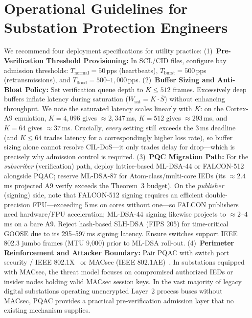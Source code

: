 \documentclass[journal]{IEEEtran}
\begin{document}
\section{Operational Guidelines for Substation Protection Engineers}
\label{sec:guidelines}
We recommend four deployment specifications for utility practice:
(1)~\textbf{Pre-Verification Threshold Provisioning:} In SCL/CID files, configure bay admission thresholds: $T_{\text{normal}} = 50$\,pps (heartbeats), $T_{\text{burst}} = 500$\,pps (retransmissions), and $T_{\text{flood}} = 500\text{--}1{,}000$\,pps.
(2)~\textbf{Buffer Sizing and Anti-Bloat Policy:} Set verification queue depth to $K \le 512$ frames. Excessively deep buffers inflate latency during saturation ($W_{\text{sat}} = K \cdot \overline{S}$) without enhancing throughput. We note the saturated latency scales linearly with $K$: on the Cortex-A9 emulation, $K=4{,}096$ gives $\approx 2{,}347$\,ms, $K=512$ gives $\approx 293$\,ms, and $K=64$ gives $\approx 37$\,ms. Crucially, \emph{every} setting still exceeds the 3\,ms deadline (and $K\le 64$ trades latency for a correspondingly higher loss rate), so buffer sizing alone cannot resolve CIL-DoS---it only trades delay for drop---which is precisely why admission control is required.
(3)~\textbf{PQC Migration Path:} For the \emph{subscriber} (verification) path, deploy lattice-based ML-DSA-44 or FALCON-512 alongside PQAC; reserve ML-DSA-87 for Atom-class/multi-core IEDs (its $\approx 2.4$\,ms projected A9 verify exceeds the Theorem~3 budget). On the \emph{publisher} (signing) side, note that FALCON-512 signing requires an efficient double-precision FPU---exceeding 5\,ms on cores without one---so FALCON publishers need hardware/FPU acceleration; ML-DSA-44 signing likewise projects to $\approx 2\text{--}4$\,ms on a bare A9. Reject hash-based SLH-DSA (FIPS 205) for time-critical GOOSE due to its 295--597\,ms signing latency. Ensure switches support IEEE 802.3 jumbo frames (MTU 9,000) prior to ML-DSA roll-out.
(4)~\textbf{Perimeter Reinforcement and Attacker Boundary:} Pair PQAC with switch port security / IEEE 802.1X~\cite{ieee8021x} or MACsec (IEEE 802.1AE)~\cite{ieee8021ae}. In substations equipped with MACsec, the threat model focuses on compromised authorized IEDs or insider nodes holding valid MACsec session keys. In the vast majority of legacy digital substations operating unencrypted Layer~2 process buses without MACsec, PQAC provides a practical pre-verification admission layer that no existing mechanism supplies.
\end{document}
